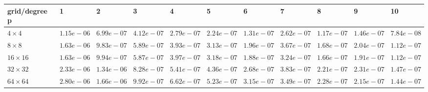 \begin{tabular}{lllllllllll}
\hline
 grid/degree p   & 1          & 2          & 3          & 4          & 5          & 6          & 7          & 8          & 9          & 10         \\
\hline
 $4 \times 4$    & $1.15e-06$ & $6.99e-07$ & $4.12e-07$ & $2.79e-07$ & $2.24e-07$ & $1.31e-07$ & $2.62e-07$ & $1.17e-07$ & $1.46e-07$ & $7.84e-08$ \\
 $8 \times 8$    & $1.63e-06$ & $9.83e-07$ & $5.89e-07$ & $3.93e-07$ & $3.13e-07$ & $1.96e-07$ & $3.67e-07$ & $1.68e-07$ & $2.04e-07$ & $1.12e-07$ \\
 $16 \times 16$  & $1.63e-06$ & $9.94e-07$ & $5.87e-07$ & $3.97e-07$ & $3.18e-07$ & $1.88e-07$ & $3.24e-07$ & $1.66e-07$ & $1.91e-07$ & $1.12e-07$ \\
 $32 \times 32$  & $2.33e-06$ & $1.34e-06$ & $8.28e-07$ & $5.41e-07$ & $4.36e-07$ & $2.68e-07$ & $3.83e-07$ & $2.21e-07$ & $2.31e-07$ & $1.47e-07$ \\
 $64 \times 64$  & $2.80e-06$ & $1.66e-06$ & $9.92e-07$ & $6.62e-07$ & $5.23e-07$ & $3.15e-07$ & $3.49e-07$ & $2.28e-07$ & $2.15e-07$ & $1.44e-07$ \\
\hline
\end{tabular}